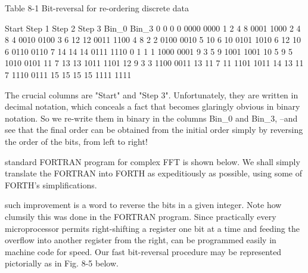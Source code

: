 Table 8-1 Bit-reversal for re-ordering discrete data

Start   Step 1  Step 2  Step 3    Bin_0 Bin_3
0       0       0       0         0000  0000
1       2       4       8         0001  1000
2       4       8       4         0010  0100
3       6       12      12        0011  1100
4       8       2       2         0100  0010
5       10      6       10        0101  1010
6       12      10      6         0110  0110
7       14      14      14        0111  1110
0       1       1       1         1000  0001
9       3       5       9         1001  1001
10      5       9       5         1010  0101
11      7       13      13        1011  1101
12      9       3       3         1100  0011
13      11      7       11        1101  1011
14      13      11      7         1110  0111
15      15      15      15        1111  1111

The crucial columns are "Start" and "Step 3". Unfortunately, they are written in decimal notation, which conceals a fact that becomes glaringly obvious in binary notation. So we re-write them in binary in the columns Bin_0 and Bin_3, --and see that the final order can be obtained from the initial order simply by reversing the order of the bits, from left to right!

 standard FORTRAN program for complex FFT is shown below. We shall simply translate the FORTRAN into FORTH as expeditiously as possible, using some of FORTH's simplifications.

 such improvement is a word to reverse the bits in a given integer. Note how clumsily this was done in the FORTRAN program. Since practically every microprocessor permits right-shifting a register one bit at a time and feeding the overflow into another register from the right,  can be programmed easily in machine code for speed. Our fast bit-reversal procedure  may be represented pictorially as in Fig. 8-5 below.

